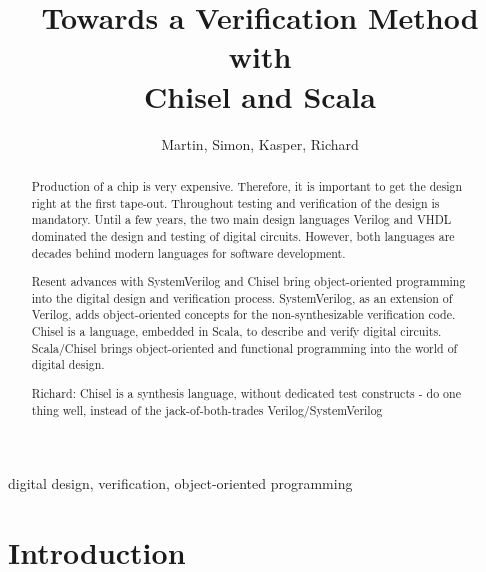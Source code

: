 \documentclass[a4paper, conference]{IEEEtran}
\newcommand{\ducky}[1]{{\color{orange} Richard: #1}}
\begin{document}

\title{Towards a Verification Method with\\
Chisel and Scala}

\author{Martin, Simon, Kasper, Richard}




\maketitle \thispagestyle{empty}

\begin{abstract}
Production of a chip is very expensive. Therefore, it is important to get the design right at the first tape-out. Throughout testing and verification of the design is mandatory.
Until a few years, the two main design languages Verilog and VHDL dominated the
design and testing of digital circuits. However, both languages are decades behind
modern languages for software development.

Resent advances with SystemVerilog and Chisel bring object-oriented programming
into the digital design and verification process. SystemVerilog, as an extension of Verilog,
adds object-oriented concepts for the non-synthesizable verification code.
Chisel is a language, embedded in Scala, to describe and verify digital circuits.
Scala/Chisel brings object-oriented and functional programming into the world of
digital design.

\ducky{Chisel is a synthesis language, without dedicated test constructs - do one thing well, instead of the jack-of-both-trades Verilog/SystemVerilog}
\end{abstract}

\begin{IEEEkeywords}
digital design, verification, object-oriented programming
\end{IEEEkeywords}


\section{Introduction}
\label{sec:intro}
\end{document}
